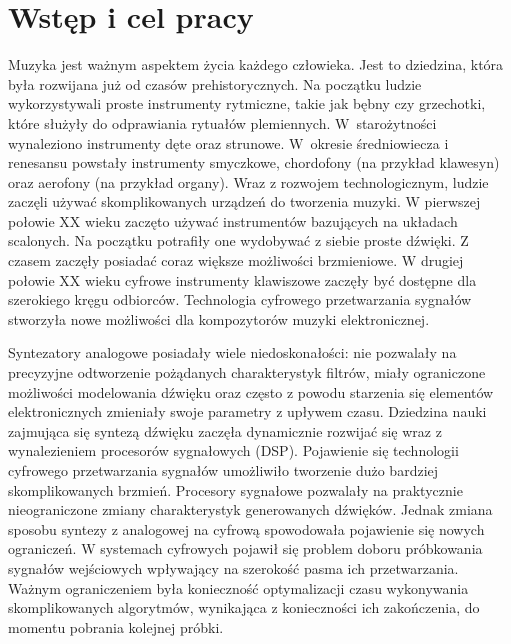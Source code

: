 \chapter{Wstęp i cel pracy}
Muzyka jest ważnym aspektem życia każdego człowieka. Jest to dziedzina, która była rozwijana już od czasów prehistorycznych. %
Na początku ludzie wykorzystywali proste instrumenty rytmiczne, takie jak bębny czy grzechotki, które służyły do odprawiania rytuałów plemiennych. W~starożytności wynaleziono instrumenty dęte oraz strunowe. W~okresie średniowiecza i renesansu powstały instrumenty smyczkowe, chordofony (na przykład klawesyn) oraz aerofony (na przykład organy).
Wraz z rozwojem technologicznym, ludzie zaczęli używać skomplikowanych urządzeń do tworzenia muzyki. W pierwszej połowie XX wieku zaczęto używać instrumentów bazujących na układach scalonych. \cite{historia_instr}
Na początku potrafiły one wydobywać z siebie proste dźwięki. Z czasem zaczęły posiadać coraz większe możliwości brzmieniowe. W drugiej połowie XX wieku cyfrowe instrumenty klawiszowe zaczęły być dostępne dla szerokiego kręgu odbiorców. Technologia cyfrowego przetwarzania sygnałów stworzyła nowe możliwości dla kompozytorów muzyki elektronicznej.

Syntezatory analogowe posiadały wiele niedoskonałości: nie pozwalały na precyzyjne odtworzenie pożądanych charakterystyk filtrów, miały ograniczone możliwości modelowania dźwięku oraz często z powodu starzenia się elementów elektronicznych zmieniały swoje parametry z upływem czasu. Dziedzina nauki zajmująca się syntezą dźwięku zaczęła dynamicznie rozwijać się wraz z wynalezieniem procesorów sygnałowych (DSP). Pojawienie się technologii cyfrowego przetwarzania sygnałów umożliwiło tworzenie dużo bardziej skomplikowanych brzmień. Procesory sygnałowe pozwalały na praktycznie nieograniczone zmiany charakterystyk generowanych dźwięków. Jednak zmiana sposobu syntezy z analogowej na cyfrową spowodowała pojawienie się nowych ograniczeń. W systemach cyfrowych pojawił się problem doboru próbkowania sygnałów wejściowych wpływający na szerokość pasma ich przetwarzania.
Ważnym ograniczeniem była konieczność optymalizacji czasu wykonywania skomplikowanych algorytmów, wynikająca z konieczności ich zakończenia, do momentu pobrania kolejnej próbki.

